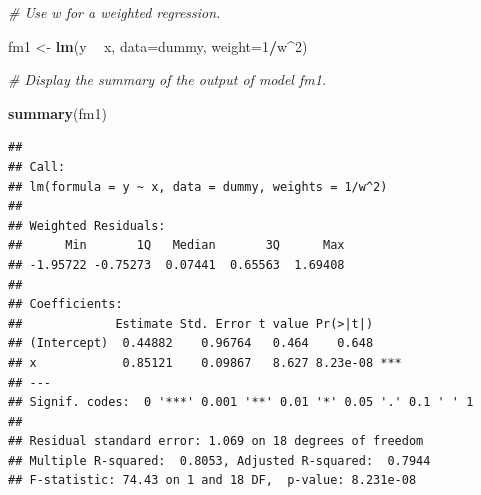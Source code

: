 \documentclass[]{book}
\newenvironment{Shaded}{\begin{snugshade}}{\end{snugshade}}
\newcommand{\CommentTok}[1]{\textcolor[rgb]{0.56,0.35,0.01}{\textit{#1}}}
\newcommand{\DataTypeTok}[1]{\textcolor[rgb]{0.13,0.29,0.53}{#1}}
\newcommand{\DecValTok}[1]{\textcolor[rgb]{0.00,0.00,0.81}{#1}}
\newcommand{\KeywordTok}[1]{\textcolor[rgb]{0.13,0.29,0.53}{\textbf{#1}}}
\newcommand{\NormalTok}[1]{#1}
\newcommand{\OperatorTok}[1]{\textcolor[rgb]{0.81,0.36,0.00}{\textbf{#1}}}
\newcommand{\StringTok}[1]{\textcolor[rgb]{0.31,0.60,0.02}{#1}}
\begin{document}
\begin{Shaded}
\begin{Highlighting}[]
\CommentTok{# Use w for a weighted regression.}

\NormalTok{fm1 <-}\StringTok{ }\KeywordTok{lm}\NormalTok{(y }\OperatorTok{~}\StringTok{ }\NormalTok{x, }\DataTypeTok{data=}\NormalTok{dummy, }\DataTypeTok{weight=}\DecValTok{1}\OperatorTok{/}\NormalTok{w}\OperatorTok{^}\DecValTok{2}\NormalTok{) }

\CommentTok{# Display the summary of the output of model fm1.}

\KeywordTok{summary}\NormalTok{(fm1)}
\end{Highlighting}
\end{Shaded}

\begin{verbatim}
## 
## Call:
## lm(formula = y ~ x, data = dummy, weights = 1/w^2)
## 
## Weighted Residuals:
##      Min       1Q   Median       3Q      Max 
## -1.95722 -0.75273  0.07441  0.65563  1.69408 
## 
## Coefficients:
##             Estimate Std. Error t value Pr(>|t|)    
## (Intercept)  0.44882    0.96764   0.464    0.648    
## x            0.85121    0.09867   8.627 8.23e-08 ***
## ---
## Signif. codes:  0 '***' 0.001 '**' 0.01 '*' 0.05 '.' 0.1 ' ' 1
## 
## Residual standard error: 1.069 on 18 degrees of freedom
## Multiple R-squared:  0.8053, Adjusted R-squared:  0.7944 
## F-statistic: 74.43 on 1 and 18 DF,  p-value: 8.231e-08
\end{verbatim}

\begin{Shaded}
\end{Shaded}
\end{document}

